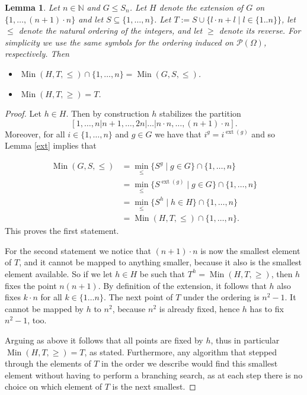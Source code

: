 \documentclass[preprint,12pt]{elsarticle}
\newtheorem{lem}[theorem]{Lemma}
\newcommand{\SX}[1]{\ensuremath{S_{#1}}\xspace}
\newcommand{\N}{\mathbb{N}}
\newcommand{\ext}{\operatorname{ext}}
\newcommand{\Min}{\operatorname{Min}}
\newcommand{\powset}{\mathcal{P}}
\begin{document}
\begin{lem}\label{ex}
Let $n \in \N$ and $G \le \SX{n}$. Let $H$ denote the extension of $G$ on
$\{1,\dots,(n+1) \cdot n\}$ and let $S \subseteq \{1,\dots,n\}$. Let
$T:=S \cup \{ l \cdot n + l \mid l \in \{1..n\}\}$, let \(\leq\) denote the natural
ordering of the integers, and let \(\geq\) denote its reverse. For simplicity we use the same symbols for the ordering induced on $\powset(\Omega)$, respectively. Then

\begin{itemize}
\item \(\Min(H,T, \le) \cap \{1,\dots,n\} = \Min(G,S, \le)\).
\item \(\Min(H,T,\ge)=T\).
\end{itemize}
\end{lem}

\begin{proof}
Let $h \in H$. Then by construction $h$ stabilizes the partition
$$[1,\dots,n|n+1,\dots,2n|\dots|n \cdot n,\dots,(n+1)\cdot n].$$ 
Moreover, for all $i \in \{1,\dots,n\}$ and $g \in G$ we have that $i^g=i^{\ext(g)}$
and so Lemma \ref{ext} implies that

\begin{align*}
  \Min(G,S,\le) &= \min_{\le}\{S^g \mid g \in G\}  \cap \{1,\dots,n\}\\
                &= \min_{\le}\{S^{\ext(g)} \mid g \in G\}  \cap \{1,\dots,n\}\\
                &= \min_{\le}\{S^h \mid h \in H\}  \cap \{1,\dots,n\}\\
                &= \Min(H,T, \le) \cap \{1,\dots,n\}.
\end{align*}
This proves the first statement.

For the second statement we notice that $(n + 1)\cdot n$ is now the smallest element
of $T$, and it cannot be mapped to anything smaller, because it also is the
smallest element available.
So if we let $h \in H$ be such that $T^h=\Min(H,T,\ge)$, then $h$ fixes the point $n(n + 1)$. By
definition of the extension, it follows that $h$ also fixes $k \cdot n$ for all
$k \in \{1\ldots n\}$.
The next point of $T$ under the ordering is $n^2 - 1$. It cannot be
mapped by $h$ to $n^2$, because $n^2$ is already fixed, hence $h$ has to fix
$n^2 - 1$, too.

Arguing as above it follows that all points are fixed by $h$, thus in
particular \(\Min(H,T,\ge)=T\), as stated. Furthermore, any algorithm
that stepped through the elements of \(T\) in the order we describe
would find this smallest element without having to perform a branching search,
as at each step there is no choice on which element of \(T\) is the next smallest.
\end{proof}
\end{document}

